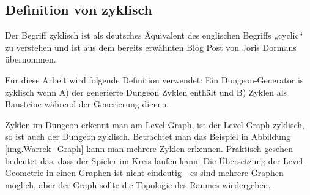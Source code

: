 






\subsection{Definition von zyklisch}\label{c.weitereskapitel}

Der Begriff zyklisch ist als deutsches Äquivalent des englischen Begriffs „cyclic“ zu verstehen und ist aus dem bereits erwähnten Blog Post von Joris Dormans \cite{blogCyclic} übernommen. 

Für diese Arbeit wird folgende Definition verwendet: Ein Dungeon-Generator is zyklisch wenn A) der generierte Dungeon Zyklen enthält und B) Zyklen als Bausteine während der Generierung dienen.


Zyklen im Dungeon erkennt man am Level-Graph, ist der Level-Graph zyklisch, so ist auch der Dungeon zyklisch. Betrachtet man das Beispiel in Abbildung \ref{img.Warrek_Graph} kann man mehrere Zyklen erkennen. Praktisch gesehen bedeutet das, dass der Spieler im Kreis laufen kann. Die Übersetzung der Level-Geometrie in einen Graphen ist nicht eindeutig - es sind mehrere Graphen möglich, aber der Graph sollte die Topologie des Raumes wiedergeben. 


